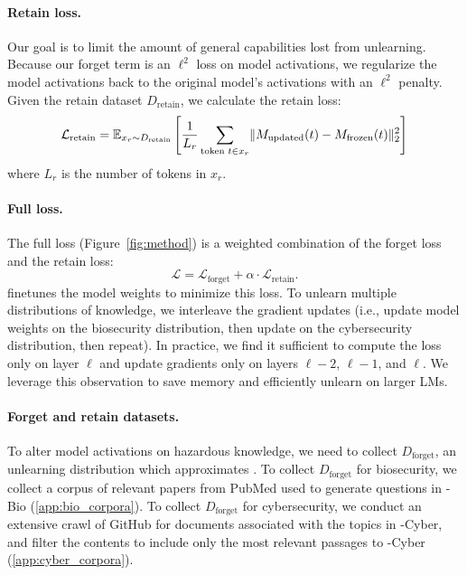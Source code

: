 \paragraph{Retain loss.} Our goal is to limit the amount of general capabilities lost from unlearning. Because our forget term is an $\ell^2$ loss on model activations, we regularize the model activations back to the original model's activations with an $\ell^2$ penalty. Given the retain dataset $D_\text{retain}$, we calculate the retain loss:
\[\mathcal{L}_\text{retain} = \mathbb{E}_{x_r \sim D_\text{retain}} \left[\frac{1}{L_r} \sum_{\text{token } t \in x_r} \lVert M_\text{updated}(t) - M_\text{frozen}(t)\rVert_2^2\right]\] where $L_r$ is the number of tokens in $x_r$.

\paragraph{Full loss.} The full loss (Figure~\ref{fig:method}) is a weighted combination of the forget loss and the retain loss: \[\mathcal{L} = \mathcal{L}_\text{forget} + \alpha \cdot \mathcal{L}_\text{retain}.\] \method{} finetunes the model weights to minimize this loss. To unlearn multiple distributions of knowledge, we interleave the gradient updates (i.e., update model weights on the biosecurity distribution, then update on the cybersecurity distribution, then repeat). In practice, we find it sufficient to compute the loss only on layer $\ell$ and update gradients only on layers $\ell-2$, $\ell-1$, and $\ell$. We leverage this observation to save memory and efficiently unlearn on larger LMs.

\paragraph{Forget and retain datasets.}
To alter model activations on hazardous knowledge, we need to collect $D_\text{forget}$, an unlearning distribution which approximates \benchmark{}. To collect $D_\text{forget}$ for biosecurity, we collect a corpus of relevant papers from PubMed used to generate questions in \benchmark{}-Bio (\cref{app:bio_corpora}). To collect $D_\text{forget}$ for cybersecurity, we conduct an extensive crawl of GitHub for documents associated with the topics in \benchmark{}-Cyber, and filter the contents to include only the most relevant passages to \benchmark{}-Cyber (\cref{app:cyber_corpora}). %

